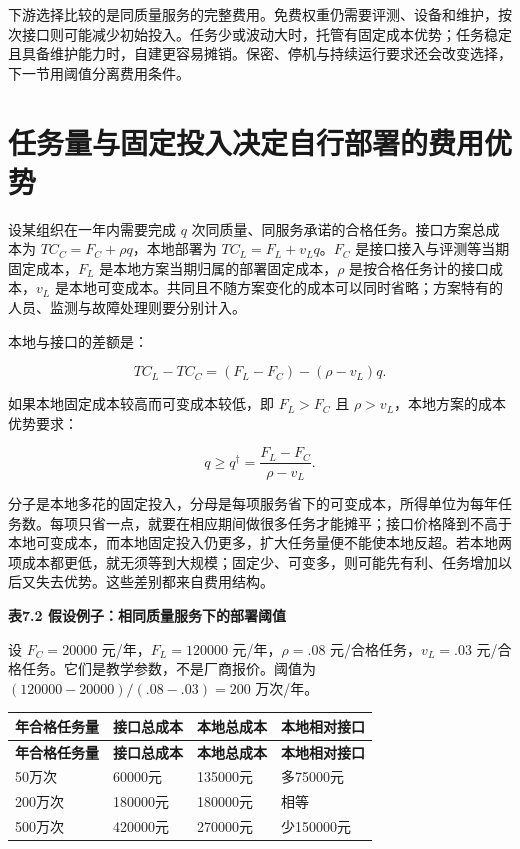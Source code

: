 \documentclass[UTF8,fontset=windows,12pt,a4paper,oneside,openany]{ctexbook}
\begin{document}
下游选择比较的是同质量服务的完整费用。免费权重仍需要评测、设备和维护，按次接口则可能减少初始投入。任务少或波动大时，托管有固定成本优势；任务稳定且具备维护能力时，自建更容易摊销。保密、停机与持续运行要求还会改变选择，下一节用阈值分离费用条件。

\section{任务量与固定投入决定自行部署的费用优势}

设某组织在一年内需要完成 $q$ 次同质量、同服务承诺的合格任务。接口方案总成本为 $TC_C=F_C+\rho q$，本地部署为 $TC_L=F_L+v_Lq$。$F_C$ 是接口接入与评测等当期固定成本，$F_L$ 是本地方案当期归属的部署固定成本，$\rho$ 是按合格任务计的接口成本，$v_L$ 是本地可变成本。共同且不随方案变化的成本可以同时省略；方案特有的人员、监测与故障处理则要分别计入。

本地与接口的差额是：

\[
TC_L-TC_C=(F_L-F_C)-(\rho-v_L)q.
\]

如果本地固定成本较高而可变成本较低，即 $F_L>F_C$ 且 $\rho>v_L$，本地方案的成本优势要求：

\[
q\ge q^{\dagger}=\frac{F_L-F_C}{\rho-v_L}.
\]

分子是本地多花的固定投入，分母是每项服务省下的可变成本，所得单位为每年任务数。每项只省一点，就要在相应期间做很多任务才能摊平；接口价格降到不高于本地可变成本，而本地固定投入仍更多，扩大任务量便不能使本地反超。若本地两项成本都更低，就无须等到大规模；固定少、可变多，则可能先有利、任务增加以后又失去优势。这些差别都来自费用结构。

\textbf{表7.2 假设例子：相同质量服务下的部署阈值}

设 $F_C=20000$ 元/年，$F_L=120000$ 元/年，$\rho=.08$ 元/合格任务，$v_L=.03$ 元/合格任务。它们是教学参数，不是厂商报价。阈值为 $(120000-20000)/(.08-.03)=200$ 万次/年。

\begingroup\footnotesize\setlength{\tabcolsep}{4pt}\renewcommand{\arraystretch}{1.25}
\begin{longtable}{>{\raggedright\arraybackslash}p{}>{\raggedright\arraybackslash}p{}>{\raggedright\arraybackslash}p{}>{\raggedright\arraybackslash}p{}}
\toprule
\textbf{年合格任务量} & \textbf{接口总成本} & \textbf{本地总成本} & \textbf{本地相对接口} \\
\midrule\endfirsthead
\toprule
\textbf{年合格任务量} & \textbf{接口总成本} & \textbf{本地总成本} & \textbf{本地相对接口} \\
\midrule\endhead
\bottomrule\endfoot
50万次 & 60000元 & 135000元 & 多75000元 \\
200万次 & 180000元 & 180000元 & 相等 \\
500万次 & 420000元 & 270000元 & 少150000元 \\
\end{longtable}\endgroup
\end{document}
